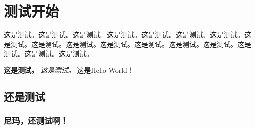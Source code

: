 \documentclass{ctexart}
\begin{document}
\section{测试开始}
这是测试。这是测试。这是测试。这是测试。这是测试。这是测试。这是测试。这是测试。这是测试。这是测试。这是测试。这是测试。这是测试。这是测试。这是测试。这是测试。这是测试。

{\bf 这是测试。}
{\it 这是测试。}
这是Hello World！

\subsection{还是测试}
\subsubsection{尼玛，还测试啊！}
\end{document}
